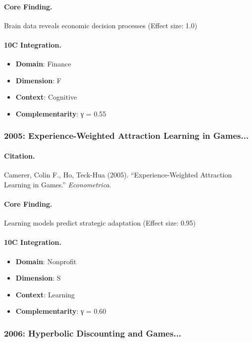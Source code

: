 \paragraph{Core Finding.}
Brain data reveals economic decision processes (Effect size: 1.0)

\paragraph{10C Integration.}
\begin{itemize}[nosep]
  \item \textbf{Domain}: Finance
  \item \textbf{Dimension}: F
  \item \textbf{Context}: Cognitive
  \item \textbf{Complementarity}: γ = 0.55
\end{itemize}

\subsubsection{2005: Experience-Weighted Attraction Learning in Games...}

\paragraph{Citation.}
Camerer, Colin F., Ho, Teck-Hua (2005). ``Experience-Weighted Attraction Learning in Games.''
\textit{Econometrica}.

\paragraph{Core Finding.}
Learning models predict strategic adaptation (Effect size: 0.95)

\paragraph{10C Integration.}
\begin{itemize}[nosep]
  \item \textbf{Domain}: Nonprofit
  \item \textbf{Dimension}: S
  \item \textbf{Context}: Learning
  \item \textbf{Complementarity}: γ = 0.60
\end{itemize}

\subsubsection{2006: Hyperbolic Discounting and Games...}

